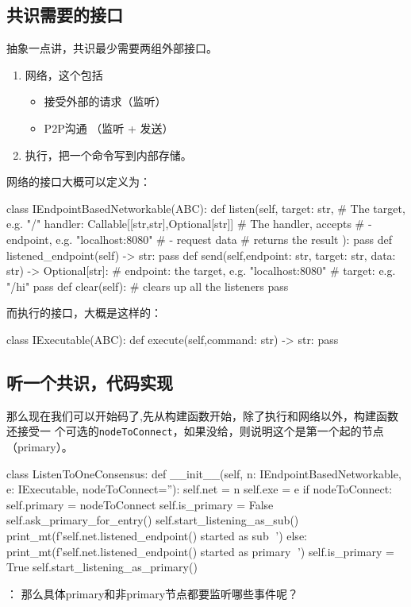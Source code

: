 \subsection{共识需要的接口}
抽象一点讲，共识最少需要两组外部接口。
\begin{enumerate}
\item 网络，这个包括
  \begin{itemize}
  \item 接受外部的请求（监听）
  \item P2P沟通 （监听 + 发送）
  \end{itemize}
\item 执行，把一个命令写到内部存储。
\end{enumerate}
网络的接口大概可以定义为：
\begin{simplepy}
class IEndpointBasedNetworkable(ABC):
    def listen(self,
               target: str,     # The target, e.g. "/"
               handler: Callable[[str,str],Optional[str]]
               # The handler, accepts
               #  - endpoint, e.g. "localhost:8080"
               #  - request data
               # returns the result
               ):
        pass
    def listened_endpoint(self) -> str:
        pass
    def send(self,endpoint: str, target: str, data: str) -> Optional[str]:
        # endpoint: the target, e.g. "localhost:8080"
        # target: e.g. "/hi"
        pass
    def clear(self):                # clears up all the listeners
        pass
\end{simplepy}
而执行的接口，大概是这样的：
\begin{simplepy}
class IExecutable(ABC):
    def execute(self,command: str) -> str:
        pass
\end{simplepy}

\subsection{\textbf{听一个共识}，代码实现}
那么现在我们可以开始码了,先从构建函数开始，除了执行和网络以外，构建函数还接受一
个可选的\texttt{nodeToConnect}，如果没给，则说明这个是第一个起的节点（primary）。
\begin{simplepy}
class ListenToOneConsensus:
    def __init__(self,
                 n: IEndpointBasedNetworkable,
                 e: IExecutable,
                 nodeToConnect=''):
        self.net = n
        self.exe = e
        if nodeToConnect:
            self.primary = nodeToConnect
            self.is_primary = False
            self.ask_primary_for_entry()
            self.start_listening_as_sub()
            print_mt(f'{self.net.listened_endpoint()} started as sub 🐸')
        else:
            print_mt(f'{self.net.listened_endpoint()} started as primary 🐸')
            self.is_primary = True
            self.start_listening_as_primary()

\end{simplepy}
 ： 那么具体primary和非primary节点都要监听哪些事件呢？

